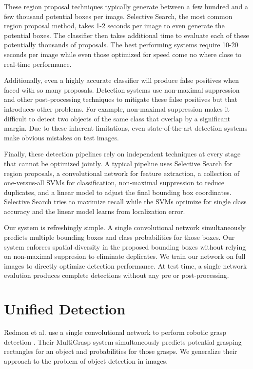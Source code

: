 \documentclass{article} %
\begin{document}
These region proposal techniques typically generate between a few hundred and a few thousand potential boxes per image. Selective Search, the most common region proposal method, takes 1-2 seconds per image to even generate the potential boxes. The classifier then takes additional time to evaluate each of these potentially thousands of proposals. The best performing systems require 10-20 seconds per image while even those optimized for speed come no where close to real-time performance.

Additionally, even a highly accurate classifier will produce false positives when faced with so many proposals. Detection systems use non-maximal suppression and other post-processing techniques to mitigate these false positives but that introduces other problems. For example, non-maximal suppression makes it difficult to detect two objects of the same class that overlap by a significant margin. Due to these inherent limitations, even state-of-the-art detection systems make obvious mistakes on test images.

Finally, these detection pipelines rely on independent techniques at every stage that cannot be optimized jointly. A typical pipeline uses Selective Search for region proposals, a convolutional network for feature extraction, a collection of one-versus-all SVMs for classification, non-maximal suppression to reduce duplicates, and a linear model to adjust the final bounding box coordinates. Selective Search tries to maximize recall while the SVMs optimize for single class accuracy and the linear model learns from localization error.

Our system is refreshingly simple. A single convolutional network simultaneously predicts multiple bounding boxes and class probabilities for those boxes. Our system enforces spatial diversity in the proposed bounding boxes without relying on non-maximal suppresion to eliminate deplicates. We train our network on full images to directly optimize detection performance. At test time, a single network evalution produces complete detections without any pre or post-processing.

\section{Unified Detection}

Redmon et al. use a single convolutional network to perform robotic grasp detection \cite{DBLP:journals/corr/RedmonA14}. Their MultiGrasp system simultaneously predicts potential grasping rectangles for an object and probabilities for those grasps. We generalize their approach to the problem of object detection in images.
\end{document}
